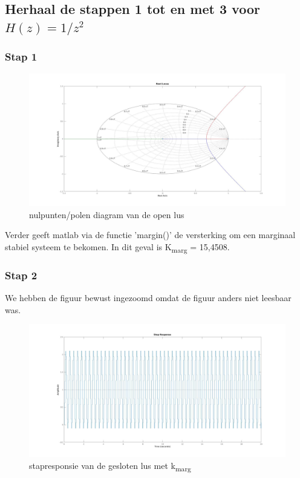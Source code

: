 \documentclass[a4paper, 12pt]{article}
\begin{document}
\subsection{Herhaal de stappen 1 tot en met 3 voor $H(z) = 1/z^2$}
\subsubsection{Stap 1}
\begin{figure}[!h]
	\includegraphics[width=1\linewidth]{Labo3_4_rootlocus3.jpg}
	\caption{nulpunten/polen diagram van de open lus}
\end{figure}

Verder geeft matlab via de functie 'margin()' de versterking om een marginaal stabiel systeem te bekomen. In dit geval is K\textsubscript{marg} = 15,4508.
\subsubsection{Stap 2}

We hebben de figuur bewust ingezoomd omdat de figuur anders niet leesbaar was.

\begin{figure}[!h]
	\includegraphics[width=1\linewidth]{Labo3_4_step_response3.jpg}
	\caption{stapresponsie van de gesloten lus met k\textsubscript{marg}}
\end{figure}
\end{document}
